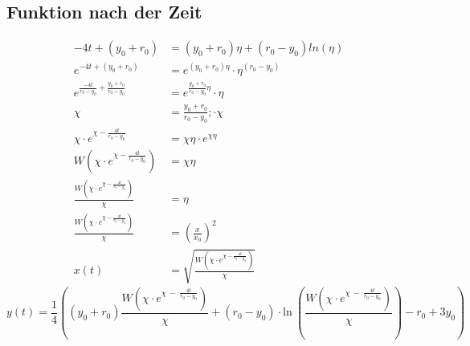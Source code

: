 \subsection{Funktion nach der Zeit 
	\label{lambertw:subsection:FunkNachT}}
\begin{align*}
	-4t+\left(y_0+r_0\right)
	&=
	\left(y_0+r_0\right)\eta+\left(r_0-y_0\right)ln\left(\eta\right) \\
	e^{-4t+\left(y_0+r_0\right)}
	&=
	e^{\left(y_0+r_0\right)\eta}\cdot\eta^{\left(r_0-y_0\right)} \\
	e^{\frac{-4t}{r_0-y_0}+\frac{y_0+r_0}{r_0-y_0}}
	&=
	e^{\frac{y_0+r_0}{r_0-y_0}\eta}\cdot\eta\  \\
	\chi
	&=
	\frac{y_0+r_0}{r_0-y_0}; \cdot\chi \\
	\chi\cdot e^{\chi-\frac{4t}{r_0-y_0}}
	&=
	\chi\eta\cdot e^{\chi\eta} \\
	W\left(\chi\cdot e^{\chi-\frac{4t}{r_0-y_0}}\right)
	&=
	\chi\eta \\
	\frac{W\left(\chi\cdot e^{\chi-\frac{4t}{r_0-y_0}}\right)}{\chi}
	&=
	\eta \\
	\frac{W\left(\chi\cdot e^{\chi-\frac{4t}{r_0-y_0}}\right)}{\chi}
	&=
	\left(\frac{x}{x_0}\right)^2 \\
	x\left(t\right)
	&=
	\sqrt{\frac{W\left(\chi\cdot e^{\chi-\frac{4t}{r_0-y_0}}\right)}{\chi}}
\end{align*}
\begin{equation}
	y(t)
	=
	\frac{1}{4}\left(\left(y_0+r_0\right)\frac{W\left(\chi\cdot e^{\chi\ -\ \frac{4t}{r_0-y_0}}\right)}{\chi}+\left(r_0-y_0\right)\cdot\mathrm{ln}\ \left(\frac{W\left(\chi\cdot e^{\chi\ -\ \frac{4t}{r_0-y_0}}\right)}{\chi}\right)-r_0+3y_0\right)
	\label{lambertw:funkNachT}
\end{equation}
